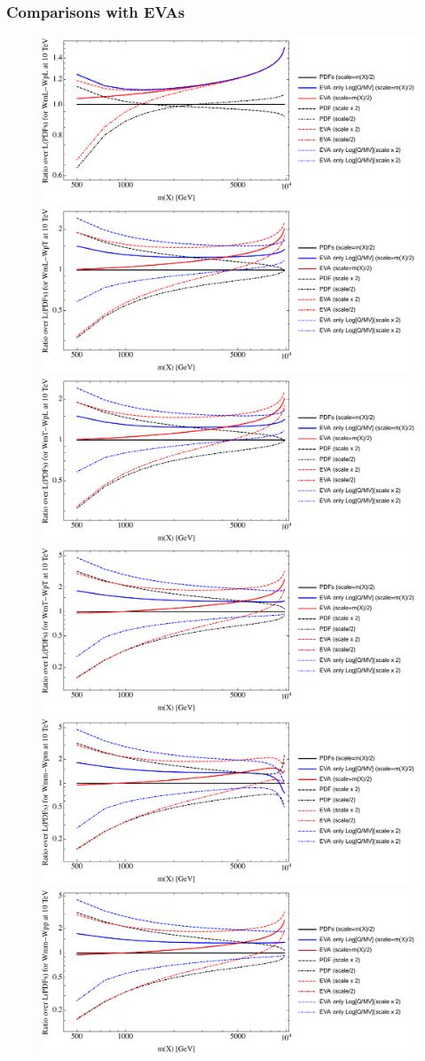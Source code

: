 \documentclass[a4paper,11pt]{article}
\begin{document}
\clearpage
\subsubsection{Comparisons with EVAs}

\begin{figure}[ht]
\includegraphics[width=0.46\linewidth]{Notebooks/PlotLumi/10TeV/ratios/WmL-WpL.pdf}
\includegraphics[width=0.46\linewidth]{Notebooks/PlotLumi/10TeV/ratios/WmL-WpT.pdf}
\includegraphics[width=0.46\linewidth]{Notebooks/PlotLumi/10TeV/ratios/WmT-WpL.pdf}
\includegraphics[width=0.46\linewidth]{Notebooks/PlotLumi/10TeV/ratios/WmT-WpT.pdf}
\includegraphics[width=0.46\linewidth]{Notebooks/PlotLumi/10TeV/ratios/Wmm-Wpm.pdf}
\includegraphics[width=0.46\linewidth]{Notebooks/PlotLumi/10TeV/ratios/Wmm-Wpp.pdf}
\end{figure}
\end{document}
